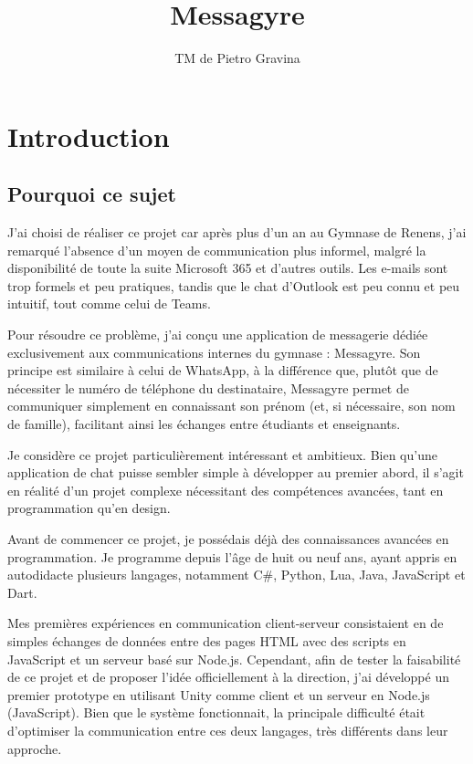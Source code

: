 \documentclass[12pt]{report}
\title{Messagyre}
\author{TM de Pietro Gravina}
\begin{document}
\maketitle

\chapter{Introduction}

\section{Pourquoi ce sujet}

J’ai choisi de réaliser ce projet car après plus d’un an au Gymnase de Renens, j’ai remarqué l’absence d’un moyen de communication plus informel, malgré la disponibilité de toute la suite Microsoft 365 et d’autres outils. Les e-mails sont trop formels et peu pratiques, tandis que le chat d’Outlook est peu connu et peu intuitif, tout comme celui de Teams.

Pour résoudre ce problème, j’ai conçu une application de messagerie dédiée exclusivement aux communications internes du gymnase : Messagyre. Son principe est similaire à celui de WhatsApp, à la différence que, plutôt que de nécessiter le numéro de téléphone du destinataire, Messagyre permet de communiquer simplement en connaissant son prénom (et, si nécessaire, son nom de famille), facilitant ainsi les échanges entre étudiants et enseignants.

Je considère ce projet particulièrement intéressant et ambitieux. Bien qu’une application de chat puisse sembler simple à développer au premier abord, il s’agit en réalité d’un projet complexe nécessitant des compétences avancées, tant en programmation qu’en design.

Avant de commencer ce projet, je possédais déjà des connaissances avancées en programmation. Je programme depuis l’âge de huit ou neuf ans, ayant appris en autodidacte plusieurs langages, notamment C\#, Python, Lua, Java, JavaScript et Dart.

Mes premières expériences en communication client-serveur consistaient en de simples échanges de données entre des pages HTML avec des scripts en JavaScript et un serveur basé sur Node.js. Cependant, afin de tester la faisabilité de ce projet et de proposer l’idée officiellement à la direction, j’ai développé un premier prototype en utilisant Unity comme client et un serveur en Node.js (JavaScript). Bien que le système fonctionnait, la principale difficulté était d’optimiser la communication entre ces deux langages, très différents dans leur approche.
\end{document}
